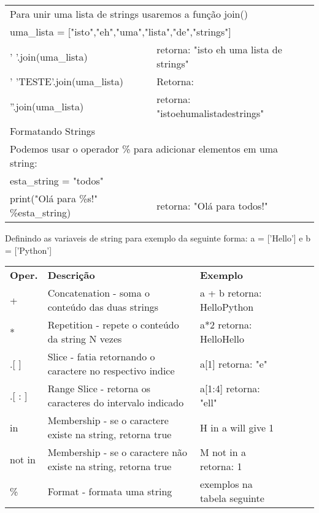 \documentclass[landscape,a0paper,fontscale=0.285]{baposter} %
\begin{document}
\begin{poster}
{\begin{tabular}{@{}lp{10.2cm}l@{}}
\multicolumn{2}{l}{Para unir uma lista de strings usaremos a função join() } \\
\multicolumn{2}{l}{uma\_lista = ["isto","eh","uma","lista","de","strings"]} \\
' '.join(uma\_lista) & retorna: "isto eh uma lista de strings" \\
' 'TESTE'.join(uma\_lista) & Retorna: \\
''.join(uma\_lista) & retorna: "istoehumalistadestrings" \\
\multicolumn{2}{l}{\cellcolor[HTML]{DDFFFF}Formatando Strings} \\
\multicolumn{2}{l}{Podemos usar o operador \% para adicionar elementos em uma string:} \\
\multicolumn{2}{l}{esta\_string = "todos"} \\
print("Olá para \%s!" \%esta\_string) & retorna: "Olá para todos!" \\
\end{tabular}
\linebreak

\colorbox[HTML]{CCFFFF}{}
Definindo as variaveis de string para exemplo da seguinte forma: a = ['Hello'] e b = ['Python'] \\
\begin{tabular}{lp{9.0cm}lp{1.0cm}lp{1.0cm}} %
{\bf Oper.} & {\bf Descrição} & {\bf Exemplo} \\
+ & Concatenation - soma o conteúdo das duas strings & a + b retorna: HelloPython \\
* & Repetition - repete o conteúdo da string N vezes & a*2 retorna: HelloHello \\
.[ ] & Slice - fatia retornando o caractere no respectivo indice & a[1] retorna: "e" \\
.[ : ] & Range Slice - retorna os caracteres do intervalo indicado & a[1:4] retorna: "ell" \\
in & Membership - se o caractere existe na string, retorna true & H in a will give 1 \\
not in & Membership - se o caractere não existe na string, retorna true & M not in a retorna: 1 \\
\% & Format - formata uma string & exemplos na tabela seguinte \\
\end{tabular}

}
\end{poster}
\end{document}
